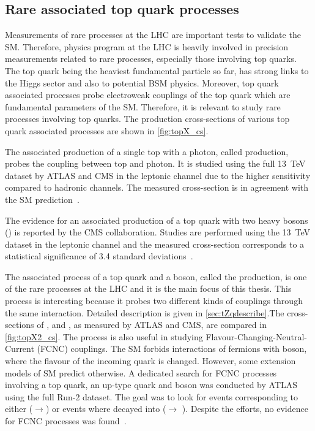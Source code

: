 \subsection{Rare associated top quark processes}
Measurements of rare processes at the LHC are important tests to validate the SM. Therefore,
physics program at the LHC is heavily involved in precision measurements related to rare processes,
especially those involving top quarks. 
The top quark being the heaviest fundamental particle so far, has strong links to the Higgs
sector and also to potential BSM physics. Moreover, top quark associated processes probe 
electroweak couplings of the top quark which are fundamental parameters of the SM. 
Therefore, it is relevant to study rare processes involving top quarks. The production 
cross-sections of various top quark associated processes are shown in \cref{fig:topX_cs}.

The associated production of a single top with a photon, called \tqgamma production, probes
the coupling between top and photon. It is studied using the full \SI{13}{\TeV} dataset by ATLAS
and CMS in the leptonic channel due to the higher sensitivity compared to hadronic channels. The
measured cross-section is in agreement with the SM prediction~\cite{PhysRevLett.131.181901}.

The evidence for an associated production of a top quark with two heavy bosons (\tWZ) is 
reported by the CMS collaboration. Studies are performed using the \SI{13}{\TeV} dataset
in the leptonic channel and the measured cross-section corresponds to a statistical
significance of 3.4 standard deviations~\cite{CMS:2023krq}. 

The associated process of a top quark and a \PZ boson, called the \tZq production,
is one of the rare processes at the LHC and it is the main focus of this thesis. This process
is interesting because it probes two different kinds of couplings through the same interaction.
Detailed description is given in \cref{sec:tZqdescribe}.The cross-sections of \tZq, \tWZ and 
\tqgamma, as measured by ATLAS and CMS, are compared in \cref{fig:topX2_cs}. 
The \tZq process is also useful in
studying Flavour-Changing-Neutral-Current (FCNC) couplings. The SM forbids 
interactions of fermions with \PZ boson, where the flavour of the incoming quark is changed. 
However, some extension models of SM predict otherwise. A dedicated search for FCNC processes involving
a top quark, an up-type quark and \PZ boson was conducted by ATLAS using the full Run-2 dataset.
The goal was to look for events corresponding to either (\Pgluon{}\Pq$\rightarrow$\Ptop{}\PZ)
or events where \Ptop decayed into \PZ (\Ptop $\rightarrow$ \Pq{}\PZ). Despite the efforts, no 
evidence for FCNC processes was found~\cite{TOPQ-2019-06}.

